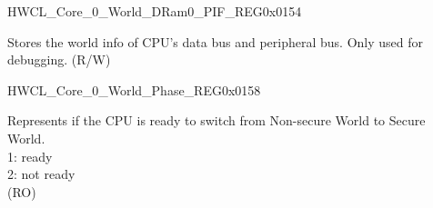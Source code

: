 \begin{register}{H}{WCL\_Core\_0\_World\_DRam0\_PIF\_REG}{0x0154}\label{regdesc:WCLCORE0WORLDDRAM0PIFREG}
%
%
\regnewline%
\begin{regdesc}\begin{reglist}
\label{fielddesc:WCLCORE0WORLDDRAM0PIF}\item [WCL\_CORE\_0\_WORLD\_DRAM0\_PIF] Stores the world info of CPU's data bus and peripheral bus. Only used for debugging. (R/W)
\end{reglist}\end{regdesc}
\end{register}


\begin{register}{H}{WCL\_Core\_0\_World\_Phase\_REG}{0x0158}\label{regdesc:WCLCORE0WORLDPHASEREG}
%
%
\regnewline%
\begin{regdesc}\begin{reglist}
\label{fielddesc:WCLCORE0WORLDPHASE}\item [WCL\_CORE\_0\_WORLD\_PHASE] Represents if the CPU is ready to switch from Non-secure World to Secure World. \\
1: ready \\
2: not ready\\ 
(RO)
\end{reglist}\end{regdesc}
\end{register}

